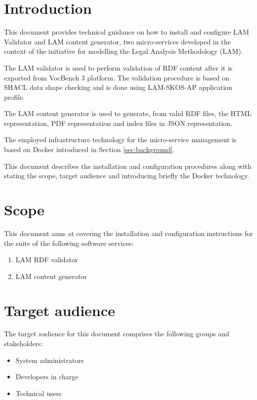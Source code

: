 \section{Introduction}
\label{sec:introduction}	
       
   	This document provides technical guidance on how to install and configure LAM Validator and LAM content generator, two micro-services developed in the context of the initiative for modelling the Legal Analysis Methodology (LAM). 
    
    The LAM validator is used to perform validation of RDF content after it is exported from VocBench 3 platform. The validation procedure is based on SHACL data shape checking and is done using LAM-SKOS-AP application profile. 
    
    The LAM content generator is used to generate, from valid RDF files, the HTML representation, PDF representation and index files in JSON representation. 	

	The employed infrastructure technology for the micro-service management is based on Docker introduced in Section \ref{sec:background}.
	    
    This document describes the installation and configuration procedures along with stating the scope, target audience and introducing briefly the Docker technology.
    
\section{Scope}
\label{sec:scope}

	This document aims at covering the installation and configuration instructions for the suite of the following software services:
	
	\begin{enumerate}
		\item LAM RDF validator
		\item LAM content generator
	\end{enumerate}

\section{Target audience}
\label{sec:audience}
	
	The target audience for this document comprises the following groups and stakeholders:	
	\begin{itemize}
		\item System administrators
		\item Developers in charge
		\item Technical users 
	\end{itemize}	
		
